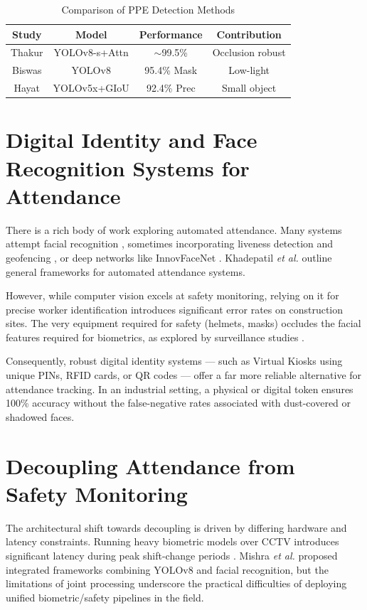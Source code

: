 \documentclass[conference]{IEEEtran}
\begin{document}
\begin{table}[htbp]
\caption{Comparison of PPE Detection Methods}
\begin{center}
\begin{tabular}{|c|c|c|c|}
\hline
\textbf{Study} & \textbf{Model} & \textbf{Performance} & \textbf{Contribution} \\
\hline
Thakur \cite{thakur2023} & YOLOv8-s+Attn & $\sim$99.5\% & Occlusion robust \\
\hline
Biswas \cite{biswas2024} & YOLOv8 & 95.4\% Mask & Low-light \\
\hline
Hayat \cite{hayat2022} & YOLOv5x+GIoU & 92.4\% Prec & Small object \\
\hline
\end{tabular}
\label{tab1}
\end{center}
\end{table}

\section{Digital Identity and Face Recognition Systems for Attendance}
There is a rich body of work exploring automated attendance. Many systems attempt facial recognition \cite{ashritha2022}, sometimes incorporating liveness detection and geofencing \cite{pawar2023}, or deep networks like InnovFaceNet \cite{gururaj2021}. Khadepatil \textit{et al.} \cite{khadepatil2022} outline general frameworks for automated attendance systems.

However, while computer vision excels at safety monitoring, relying on it for precise worker identification introduces significant error rates on construction sites. The very equipment required for safety (helmets, masks) occludes the facial features required for biometrics, as explored by surveillance studies \cite{kapil2020}. 

Consequently, robust digital identity systems — such as Virtual Kiosks using unique PINs, RFID cards, or QR codes — offer a far more reliable alternative for attendance tracking. In an industrial setting, a physical or digital token ensures 100\% accuracy without the false-negative rates associated with dust-covered or shadowed faces.

\section{Decoupling Attendance from Safety Monitoring}
The architectural shift towards decoupling is driven by differing hardware and latency constraints. Running heavy biometric models over CCTV introduces significant latency during peak shift-change periods \cite{kapil2020}. Mishra \textit{et al.} \cite{mishra2026} proposed integrated frameworks combining YOLOv8 and facial recognition, but the limitations of joint processing underscore the practical difficulties of deploying unified biometric/safety pipelines in the field.
\end{document}

